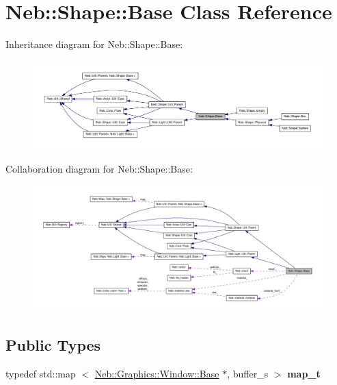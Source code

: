 \hypertarget{classNeb_1_1Shape_1_1Base}{\section{\-Neb\-:\-:\-Shape\-:\-:\-Base \-Class \-Reference}
\label{classNeb_1_1Shape_1_1Base}
}


\-Inheritance diagram for \-Neb\-:\-:\-Shape\-:\-:\-Base\-:\nopagebreak
\begin{figure}[H]
\begin{center}
\leavevmode
\includegraphics[width=350pt]{classNeb_1_1Shape_1_1Base__inherit__graph}
\end{center}
\end{figure}


\-Collaboration diagram for \-Neb\-:\-:\-Shape\-:\-:\-Base\-:\nopagebreak
\begin{figure}[H]
\begin{center}
\leavevmode
\includegraphics[width=350pt]{classNeb_1_1Shape_1_1Base__coll__graph}
\end{center}
\end{figure}
\subsection*{\-Public \-Types}
\begin{DoxyCompactItemize}
\item 
\hypertarget{classNeb_1_1Shape_1_1Base_a3b7d09a29f7f70894012e5ec8f27018e}{typedef std\-::map\*
$<$ \hyperlink{classNeb_1_1Graphics_1_1Window_1_1Base}{\-Neb\-::\-Graphics\-::\-Window\-::\-Base} \*
$\ast$, buffer\-\_\-s $>$ {\bfseries map\-\_\-t}}\label{classNeb_1_1Shape_1_1Base_a3b7d09a29f7f70894012e5ec8f27018e}

\end{DoxyCompactItemize}
